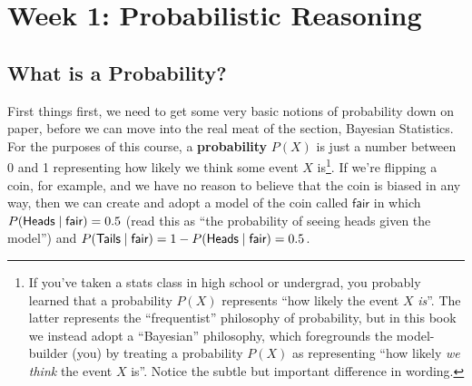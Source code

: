 \section{Week 1: Probabilistic Reasoning}

\subsection{What is a Probability?}

First things first, we need to get some very basic notions of probability down on paper, before we can move into the real meat of the section, Bayesian Statistics. For the purposes of this course, a \textbf{probability} $P(X)$ is just a number between 0 and 1 representing how likely we think some event $X$ is\footnote{If you've taken a stats class in high school or undergrad, you probably learned that a probability $P(X)$ represents ``how likely the event $X$ \textit{is}''. The latter represents the ``frequentist'' philosophy of probability, but in this book we instead adopt a ``Bayesian'' philosophy, which foregrounds the model-builder (you) by treating a probability $P(X)$ as representing ``how likely \textit{we think} the event $X$ is''. Notice the subtle but important difference in wording.}. If we're flipping a coin, for example, and we have no reason to believe that the coin is biased in any way, then we can create and adopt a model of the coin called $\textsf{fair}$ in which $P(\textsf{Heads}{} \; | \;{} \textsf{fair}{}) = 0.5$ (read this as ``the probability of seeing heads given the \fair{} model'') and $P(\textsf{Tails}{} \; | \;{} \textsf{fair}{}) = 1 - P(\textsf{Heads}{} \; | \;{} \textsf{fair}{}) = 0.5$.

